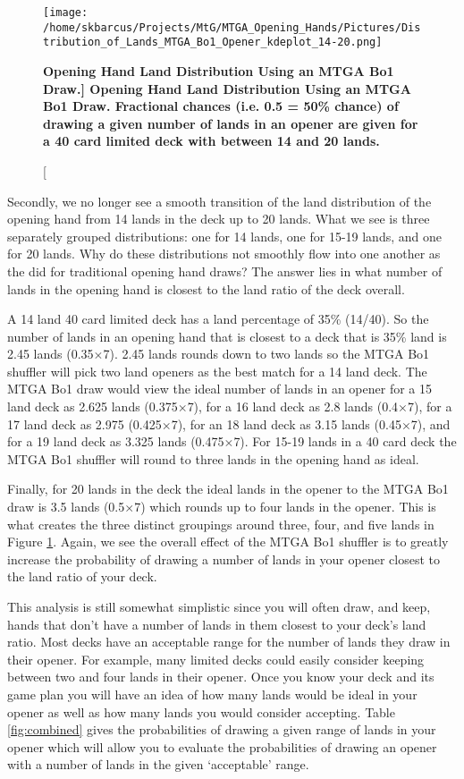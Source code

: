 \documentclass[oneside]{book}   %
\begin{document}
 	\begin{figure}[!ht]
	\centering
	\centerline{\texttt{[image: /home/skbarcus/Projects/MtG/MTGA\_Opening\_Hands/Pictures/Distribution\_of\_Lands\_MTGA\_Bo1\_Opener\_kdeplot\_14-20.png]}}
	\caption[\bf{Opening Hand Land Distribution Using an MTGA Bo1 Draw.}]{
	{\bf{Opening Hand Land Distribution Using an MTGA Bo1 Draw.}} Fractional chances (i.e. 0.5 = 50\% chance) of drawing a given number of lands in an opener are given for a 40 card limited deck with between 14 and 20 lands.}
	\label{fig:bo1_distributions}
	\end{figure}	

Secondly, we no longer see a smooth transition of the land distribution of the opening hand from 14 lands in the deck up to 20 lands. What we see is three separately grouped distributions: one for 14 lands, one for 15-19 lands, and one for 20 lands. Why do these distributions not smoothly flow into one another as the did for traditional opening hand draws? The answer lies in what number of lands in the opening hand is closest to the land ratio of the deck overall. 

A 14 land 40 card limited deck has a land percentage of 35\% (14/40). So the number of lands in an opening hand that is closest to a deck that is 35\% land is 2.45 lands (0.35$\times$7). 2.45 lands rounds down to two lands so the MTGA Bo1 shuffler will pick two land openers as the best match for a 14 land deck. The MTGA Bo1 draw would view the ideal number of lands in an opener for a 15 land deck as 2.625 lands (0.375$\times$7), for a 16 land deck as 2.8 lands (0.4$\times$7), for a 17 land deck as 2.975 (0.425$\times$7), for an 18 land deck as 3.15 lands (0.45$\times$7), and for a 19 land deck as 3.325 lands (0.475$\times$7). For 15-19 lands in a 40 card deck the MTGA Bo1 shuffler will round to three lands in the opening hand as ideal. 

Finally, for 20 lands in the deck the ideal lands in the opener to the MTGA Bo1 draw is 3.5 lands (0.5$\times$7) which rounds up to four lands in the opener. This is what creates the three distinct groupings around three, four, and five lands in Figure \ref{fig:bo1_distributions}. Again, we see the overall effect of the MTGA Bo1 shuffler is to greatly increase the probability of drawing a number of lands in your opener closest to the land ratio of your deck. 

This analysis is still somewhat simplistic since you will often draw, and keep, hands that don't have a number of lands in them closest to your deck's land ratio. Most decks have an acceptable range for the number of lands they draw in their opener. For example, many limited decks could easily consider keeping between two and four lands in their opener. Once you know your deck and its game plan you will have an idea of how many lands would be ideal in your opener as well as how many lands you would consider accepting. Table \ref{fig:combined} gives the probabilities of drawing a given range of lands in your opener which will allow you to evaluate the probabilities of drawing an opener with a number of lands in the given `acceptable' range.
\end{document}
